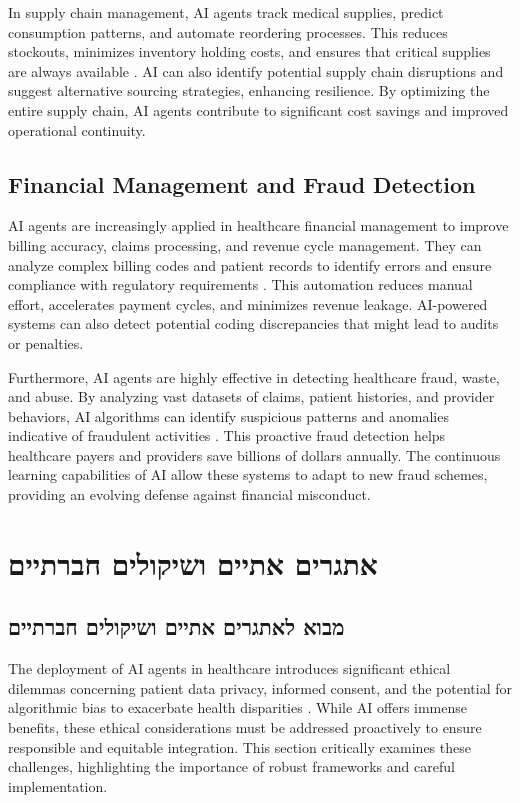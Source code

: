 \documentclass[12pt,a4paper]{article}
\begin{document}
In supply chain management, AI agents track medical supplies, predict consumption patterns, and automate reordering processes. This reduces stockouts, minimizes inventory holding costs, and ensures that critical supplies are always available \cite{dataart_digital_transformation}. AI can also identify potential supply chain disruptions and suggest alternative sourcing strategies, enhancing resilience. By optimizing the entire supply chain, AI agents contribute to significant cost savings and improved operational continuity.

\subsection{Financial Management and Fraud Detection}
\label{subsec:financial-management}
AI agents are increasingly applied in healthcare financial management to improve billing accuracy, claims processing, and revenue cycle management. They can analyze complex billing codes and patient records to identify errors and ensure compliance with regulatory requirements \cite{practolytics_medical_billing}. This automation reduces manual effort, accelerates payment cycles, and minimizes revenue leakage. AI-powered systems can also detect potential coding discrepancies that might lead to audits or penalties.

Furthermore, AI agents are highly effective in detecting healthcare fraud, waste, and abuse. By analyzing vast datasets of claims, patient histories, and provider behaviors, AI algorithms can identify suspicious patterns and anomalies indicative of fraudulent activities \cite{alation_data_catalog}. This proactive fraud detection helps healthcare payers and providers save billions of dollars annually. The continuous learning capabilities of AI allow these systems to adapt to new fraud schemes, providing an evolving defense against financial misconduct.

\section{\texthebrew{אתגרים אתיים ושיקולים חברתיים}}
\label{sec:ethical-challenges}
\subsection{\texthebrew{מבוא לאתגרים אתיים ושיקולים חברתיים}}
\label{subsec:ethics-intro-hebrew}
The deployment of AI agents in healthcare introduces significant ethical dilemmas concerning patient data privacy, informed consent, and the potential for algorithmic bias to exacerbate health disparities \cite{nih_ethical_implications}. While AI offers immense benefits, these ethical considerations must be addressed proactively to ensure responsible and equitable integration. This section critically examines these challenges, highlighting the importance of robust frameworks and careful implementation.
\end{document}

